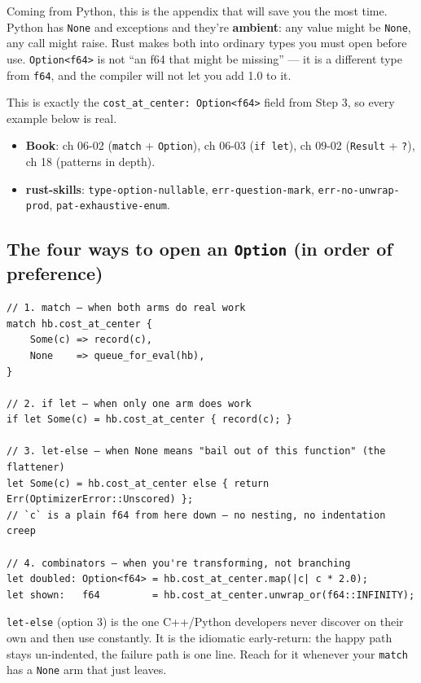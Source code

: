 \documentclass[11pt]{article}
\begin{document}
Coming from Python, this is the appendix that will save you the most time.
Python has \texttt{None} and exceptions and they're \textbf{ambient}: any value might be
\texttt{None}, any call might raise. Rust makes both into ordinary types you must open
before use. \texttt{Option<f64>} is not ``an f64 that might be missing'' — it is a
different type from \texttt{f64}, and the compiler will not let you add 1.0 to it.

This is exactly the \texttt{cost\_at\_center: Option<f64>} field from Step 3, so every
example below is real.

\begin{itemize}
\item \textbf{\textbf{Book}}: ch 06-02 (\texttt{match} + \texttt{Option}), ch 06-03 (\texttt{if let}),
ch 09-02 (\texttt{Result} + \texttt{?}), ch 18 (patterns in depth).
\item \textbf{\textbf{rust-skills}}: \texttt{type-option-nullable}, \texttt{err-question-mark},
\texttt{err-no-unwrap-prod}, \texttt{pat-exhaustive-enum}.
\end{itemize}
\subsection{The four ways to open an \texttt{Option} (in order of preference)}
\label{sec:orgab00a42}

\begin{verbatim}
// 1. match — when both arms do real work
match hb.cost_at_center {
    Some(c) => record(c),
    None    => queue_for_eval(hb),
}

// 2. if let — when only one arm does work
if let Some(c) = hb.cost_at_center { record(c); }

// 3. let-else — when None means "bail out of this function" (the flattener)
let Some(c) = hb.cost_at_center else { return Err(OptimizerError::Unscored) };
// `c` is a plain f64 from here down — no nesting, no indentation creep

// 4. combinators — when you're transforming, not branching
let doubled: Option<f64> = hb.cost_at_center.map(|c| c * 2.0);
let shown:   f64         = hb.cost_at_center.unwrap_or(f64::INFINITY);
\end{verbatim}

\texttt{let-else} (option 3) is the one C++/Python developers never discover on their
own and then use constantly. It is the idiomatic early-return: the happy path
stays un-indented, the failure path is one line. Reach for it whenever your
\texttt{match} has a \texttt{None} arm that just leaves.
\end{document}
